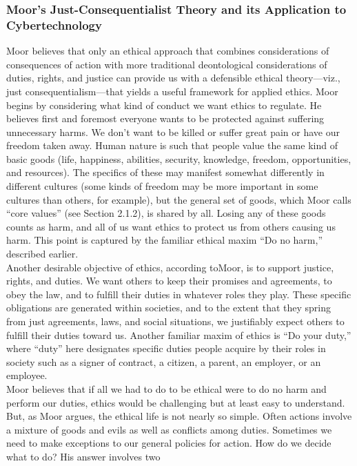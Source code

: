 \documentclass[12pt]{article}
\theoremstyle{definition}
\begin{document}
\subsubsection{Moor's Just-Consequentialist Theory and its Application to Cybertechnology}
Moor believes that only an ethical approach that combines considerations of consequences
of action with more traditional deontological considerations of duties, rights, and
justice can provide us with a defensible ethical theory—viz., just consequentialism—that
yields a useful framework for applied ethics. Moor begins by considering what kind of
conduct we want ethics to regulate. He believes first and foremost everyone wants to be
protected against suffering unnecessary harms. We don’t want to be killed or suffer great pain or have our freedom taken away. Human nature is such that people value the same
kind of basic goods (life, happiness, abilities, security, knowledge, freedom, opportunities,
and resources). The specifics of these may manifest somewhat differently in different
cultures (some kinds of freedom may be more important in some cultures than others, for
example), but the general set of goods, which Moor calls “core values” (see Section
2.1.2), is shared by all. Losing any of these goods counts as harm, and all of us want ethics
to protect us from others causing us harm. This point is captured by the familiar ethical
maxim “Do no harm,” described earlier.\\
Another desirable objective of ethics, according toMoor, is to support justice, rights,
and duties. We want others to keep their promises and agreements, to obey the law, and
to fulfill their duties in whatever roles they play. These specific obligations are generated
within societies, and to the extent that they spring from just agreements, laws, and social
situations, we justifiably expect others to fulfill their duties toward us. Another familiar maxim of ethics is “Do your duty,” where
“duty” here designates specific duties people acquire by their roles in society such as a
signer of contract, a citizen, a parent, an employer, or an employee.\\
Moor believes that if all we had to do to be ethical were to do no harm and perform
our duties, ethics would be challenging but at least easy to understand. But, as Moor
argues, the ethical life is not nearly so simple. Often actions involve a mixture of goods
and evils as well as conflicts among duties. Sometimes we need to make exceptions to
our general policies for action. How do we decide what to do? His answer involves two
\end{document}
